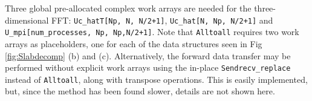 \documentclass[11pt, oneside]{article}
\newcommand{\inpyth}{\lstinline[style=pythonstyle, basicstyle=\ttfamily]} %[]%
\begin{document}
Three global pre-allocated complex work arrays are needed for the three-dimensional FFT: 
\inpyth{Uc_hatT[Np, N, N/2+1]},  \inpyth{Uc_hat[N, Np, N/2+1]} and \inpyth{U_mpi[num_processes, Np, Np,N/2+1]}. 
Note that  \inpyth{Alltoall} requires two work arrays as placeholders, one for each of the data 
structures seen in Fig \ref{fig:Slabdecomp} (b) and (c). Alternatively, the forward data transfer may be 
performed without explicit work arrays using the in-place \inpyth{Sendrecv_replace} instead of 
\inpyth{Alltoall}, along with transpose operations. This is easily implemented, but, since the method has been found slower, details are not shown here.

\begin{figure}[t!]
\end{figure}
\end{document}

